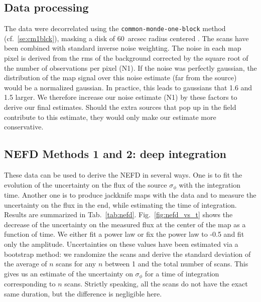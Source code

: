 \subsection{Data processing}

The data were decorrelated using the {\tt common-monde-one-block} method
(cf.~\ref{se:cm1blck}), masking a disk of 60~arcsec radius centered \hls.  The
scans have been combined with standard inverse noise weighting. The noise in
each map pixel is derived from the rms of the background corrected by the square
root of the number of observations per pixel (N1). If the noise was perfectly
gaussian, the distribution of the map signal over this noise estimate (far from
the source) would be a normalized gaussian. In practice, this leads to gaussians
that 1.6 and 1.5 larger. We therefore increase our noise estimate (N1) by these
factors to derive our final estimates. Should the extra sources that pop up in
the field contribute to this estimate, they would only make our estimate more
conservative.

\subsection{NEFD Methods 1 and 2: deep integration}

These data can be used to derive the NEFD in several ways. One is to fit the
evolution of the uncertainty on the flux of the source $\sigma_\phi$ with the
integration time. Another one is to produce jackknife maps with the data and to
measure the uncertainty on the flux in the end, while estimating the time of
integration. Results are summarized in
Tab.~\ref{tab:nefd}. Fig.~\ref{fig:nefd_vs_t} shows the decrease of the
uncertainty on the measured flux at the center of the map as a function of
time. We either fit a power law or fix the power law to -0.5 and fit only the
amplitude. Uncertainties on these values have been estimated via a bootstrap
method: we randomize the scans and derive the standard deviation of the average
of $n$ scans for any $n$ between 1 and the total number of scans. This gives us
an estimate of the uncertainty on $\sigma_\phi$ for a time of integration
corresponding to $n$ scans. Strictly speaking, all the scans do not have the
exact same duration, but the difference is negligible here.

